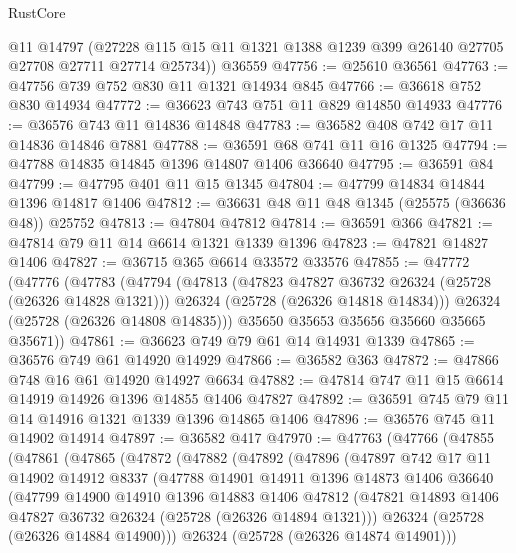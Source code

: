 \begin{lexlean}{RustCore}
\begin{coremodule}
      @11
      @14797
      (@27228 @115 @15 @11 @1321 @1388 @1239 @399 @26140 @27705 @27708 @27711 @27714 @25734))
    @36559
@47756 := @25610 @36561
@47763 := @47756 @739 @752 @830 @11 @1321 @14934 @845
@47766 := @36618 @752 @830 @14934
@47772 := @36623 @743 @751 @11 @829 @14850 @14933
@47776 := @36576 @743 @11 @14836 @14848
@47783 := @36582 @408 @742 @17 @11 @14836 @14846 @7881
@47788 := @36591 @68 @741 @11 @16 @1325
@47794 := @47788 @14835 @14845 @1396 @14807 @1406 @36640
@47795 := @36591 @84
@47799 := @47795 @401 @11 @15 @1345
@47804 := @47799 @14834 @14844 @1396 @14817 @1406
@47812 := @36631 @48 @11 @48 @1345 (@25575 (@36636 @48)) @25752
@47813 := @47804 @47812
@47814 := @36591 @366
@47821 := @47814 @79 @11 @14 @6614 @1321 @1339 @1396
@47823 := @47821 @14827 @1406
@47827 := @36715 @365 @6614 @33572 @33576
@47855 := @47772
    (@47776
      (@47783
        (@47794
          (@47813
            (@47823 @47827 @36732 @26324 (@25728 (@26326 @14828 @1321)))
            @26324
            (@25728 (@26326 @14818 @14834)))
          @26324
          (@25728 (@26326 @14808 @14835)))
        @35650
        @35653
        @35656
        @35660
        @35665
        @35671))
@47861 := @36623 @749 @79 @61 @14 @14931 @1339
@47865 := @36576 @749 @61 @14920 @14929
@47866 := @36582 @363
@47872 := @47866 @748 @16 @61 @14920 @14927 @6634
@47882 := @47814 @747 @11 @15 @6614 @14919 @14926 @1396 @14855 @1406 @47827
@47892 := @36591 @745 @79 @11 @14 @14916 @1321 @1339 @1396 @14865 @1406
@47896 := @36576 @745 @11 @14902 @14914
@47897 := @36582 @417
@47970 := @47763
    (@47766
      (@47855
        (@47861
          (@47865
            (@47872
              (@47882
                (@47892
                  (@47896
                    (@47897
                      @742
                      @17
                      @11
                      @14902
                      @14912
                      @8337
                      (@47788
                        @14901
                        @14911
                        @1396
                        @14873
                        @1406
                        @36640
                        (@47799
                          @14900
                          @14910
                          @1396
                          @14883
                          @1406
                          @47812
                          (@47821 @14893 @1406 @47827 @36732 @26324 (@25728 (@26326 @14894 @1321)))
                          @26324
                          (@25728 (@26326 @14884 @14900)))
                        @26324
                        (@25728 (@26326 @14874 @14901)))

\end{coremodule}
\end{lexlean}

